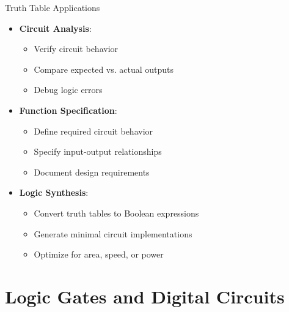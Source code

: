 \documentclass[aspectratio=169,11pt]{beamer}
\newcommand{\concept}[1]{\textbf{\color{accentcolor}#1}}
\begin{document}
\begin{frame}{Truth Table Applications}
\begin{itemize}
\item \concept{Circuit Analysis}:
\begin{itemize}
\item Verify circuit behavior
\item Compare expected vs. actual outputs
\item Debug logic errors
\end{itemize}
\vspace{0.5cm}
\item \concept{Function Specification}:
\begin{itemize}
\item Define required circuit behavior
\item Specify input-output relationships
\item Document design requirements
\end{itemize}
\vspace{0.5cm}
\item \concept{Logic Synthesis}:
\begin{itemize}
\item Convert truth tables to Boolean expressions
\item Generate minimal circuit implementations
\item Optimize for area, speed, or power
\end{itemize}
\end{itemize}
\end{frame}

\section{Logic Gates and Digital Circuits}
\end{document}
